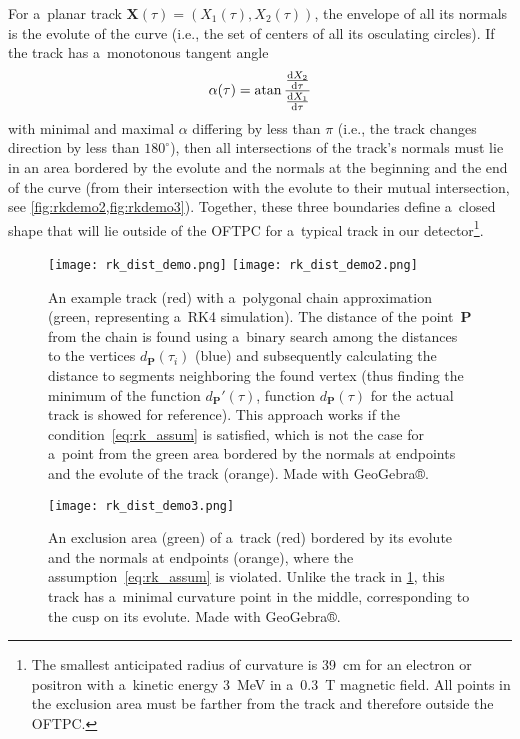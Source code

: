 		For a~planar track $\mathbf{X}(\tau) = \left(X_1(\tau),X_2(\tau)\right)$, the envelope of all its normals is the evolute of the curve (i.e., the set of centers of all its osculating circles). If the track has a~monotonous tangent angle
			\begin{equation}
				\alpha(\tau) = \atan{\frac{\dv{X_2}{\tau}}{\dv{X_1}{\tau}}}
			\end{equation}
		with minimal and maximal $\alpha$ differing by less than $\pi$ (i.e., the track changes direction by less than $180^\circ$), then all intersections of the track's normals must lie in an area bordered by the evolute and the normals at the beginning and the end of the curve (from their intersection with the evolute to their mutual intersection, see \cref{fig:rkdemo2,fig:rkdemo3}). Together, these three boundaries define a~closed shape that will lie outside of the \ac{OFTPC} for a~typical track in our detector\footnote{The smallest anticipated radius of curvature is \qty{39}{\cm} for an electron or positron with a~kinetic energy \qty{3}{\MeV} in a~\qty{0.3}{\tesla} magnetic field. All points in the exclusion area must be farther from the track and therefore outside the \ac{OFTPC}.}.
			\begin{figure}
				\centering
				\texttt{[image: rk\_dist\_demo.png]}
				\hfill
				\texttt{[image: rk\_dist\_demo2.png]}
				\caption{An example track (red) with a~polygonal chain approximation (green, representing a~\ac{RK4} simulation). The distance of the point~$\mathbf{P}$ from the chain is found using a~binary search among the distances to the vertices $d_\mathbf{P}(\tau_i)$ (blue) and subsequently calculating the distance to segments neighboring the found vertex (thus finding the minimum of the function $d_\mathbf{P}'(\tau)$, function $d_\mathbf{P}(\tau)$ for the actual track is showed for reference). This approach works if the condition~\ref{eq:rk_assum} is satisfied, which is not the case for a~point from the green area bordered by the normals at endpoints and the evolute of the track (orange). Made with GeoGebra®.}
				\label{fig:rkdemo2}
			\end{figure}
			\begin{figure}
				\centering
				\texttt{[image: rk\_dist\_demo3.png]}
				\caption{An exclusion area (green) of a~track (red) bordered by its evolute and the normals at endpoints (orange), where the assumption~\ref{eq:rk_assum} is violated. Unlike the track in \cref{fig:rkdemo2}, this track has a~minimal curvature point in the middle, corresponding to the cusp on its evolute. Made with GeoGebra®.}
				\label{fig:rkdemo3}
			\end{figure}
		
